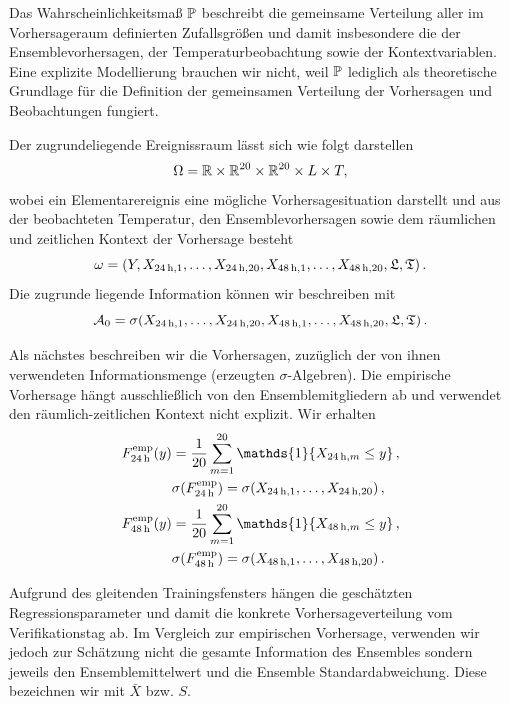 Das Wahrscheinlichkeitsmaß $\mathbb{P}$ beschreibt die gemeinsame Verteilung aller im Vorhersageraum definierten Zufallsgrößen und damit insbesondere die der Ensemblevorhersagen, der Temperaturbeobachtung sowie der Kontextvariablen. Eine explizite Modellierung brauchen wir nicht, weil $\mathbb{P}$ lediglich als theoretische Grundlage für die Definition der gemeinsamen Verteilung der Vorhersagen und Beobachtungen fungiert.

Der zugrundeliegende Ereignissraum lässt sich wie folgt darstellen
\[
\Omega=\mathbb{R} \times \mathbb{R}^{20} \times \mathbb{R}^{20} \times L \times T,
\]
wobei ein Elementarereignis eine mögliche Vorhersagesituation darstellt und aus der beobachteten Temperatur, den Ensemblevorhersagen sowie dem räumlichen und zeitlichen Kontext der Vorhersage besteht
\[
\omega = \left(Y,X_{24\,\mathrm{h},1},\dotsc,X_{24\,\mathrm{h},20}, X_{48\,\mathrm{h},1},\dotsc,X_{48\,\mathrm{h},20}, \mathfrak{L},\mathfrak{T} \right).
\]
Die zugrunde liegende Information können wir beschreiben mit
\[
\mathcal{A}_0= \sigma\!\left( X_{24\,\mathrm{h},1},\dotsc,X_{24\,\mathrm{h},20}, X_{48\,\mathrm{h},1},\dotsc,X_{48\,\mathrm{h},20}, \mathfrak{L},\mathfrak{T} \right).
\]

Als nächstes beschreiben wir die Vorhersagen, zuzüglich der von ihnen verwendeten Informationsmenge (erzeugten $\sigma$-Algebren). Die empirische Vorhersage hängt ausschließlich von den Ensemblemitgliedern ab und verwendet den räumlich-zeitlichen Kontext nicht explizit. Wir erhalten
\begin{align*}
    F^{\mathrm{emp}}_{24\h}(y)&= \frac{1}{20}\sum_{m=1}^{20} \mathds{1}\!\left\{X_{24\h,m}\le y\right\}, \\
&\sigma\!\left( F^{\mathrm{emp}}_{24\h} \right)= \sigma\!\left( X_{24\h,1},\dotsc,X_{24\h,20} \right),\\
    F^{\mathrm{emp}}_{48\h}(y)&= \frac{1}{20}\sum_{m=1}^{20} \mathds{1}\!\left\{X_{48\h,m}\le y\right\},\\
&\sigma\!\left( F^{\mathrm{emp}}_{48\h} \right) = \sigma\!\left( X_{48\h,1},\dotsc,X_{48\h,20} \right).
\end{align*}

Aufgrund des gleitenden Trainingsfensters hängen die geschätzten Regressionsparameter und damit die konkrete Vorhersageverteilung vom Verifikationstag ab. Im Vergleich zur empirischen Vorhersage, verwenden wir jedoch zur Schätzung nicht die gesamte Information des Ensembles sondern jeweils den Ensemblemittelwert und die Ensemble Standardabweichung. Diese bezeichnen wir mit $\bar{X}$  bzw. $S$.

